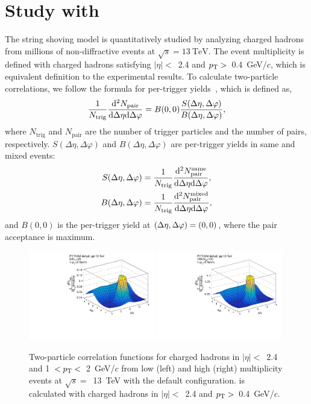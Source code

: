 
\section{Study with \pythia}
\label{sec:ana}
The string shoving model is quantitatively studied by analyzing charged hadrons from millions of non-diffractive \pythia \pp events at $\sqrt{s}=13~\mathrm{TeV}$. 
The event multiplicity is defined with charged hadrons satisfying $|\eta|<$~2.4 and $\mbox{$p_{\mathrm{T}}$}>$~0.4~GeV/$c$, which is equivalent definition to the experimental results.
To calculate two-particle correlations, we follow the formula for per-trigger yields~\cite{Khachatryan:2015lva}, which is defined as, 
\begin{align}
    \frac{1}{N_{\rm{trig}}} \frac{ {\rm d^{2}} N_{\rm{pair}} }{ \rm{d}\mbox{$\Delta\eta$} \rm{d}\mbox{$\Delta\varphi$}} = B(0,0)\frac{S(\mbox{$\Delta\eta$}, \mbox{$\Delta\varphi$})}{B(\mbox{$\Delta\eta$}, \mbox{$\Delta\varphi$})},
\end{align}
where $N_\mathrm{trig}$ and $N_\mathrm{pair}$ are the number of trigger particles and the number of pairs, respectively.
$S (\Delta\eta, \Delta\varphi)$ and $B(\Delta\eta, \Delta\varphi)$ are per-trigger yields in same and mixed events:
\begin{align}
    S(\mbox{$\Delta\eta$},\mbox{$\Delta\varphi$}) &= \frac{1}{N_{{\rm trig}}} \frac{ {\rm d^{2}} N_{\rm{pair}}^{\rm same} }{ \rm{d}\mbox{$\Delta\eta$} \rm{d}\mbox{$\Delta\varphi$}},\\
    B(\mbox{$\Delta\eta$},\mbox{$\Delta\varphi$}) &= \frac{1}{N_{{\rm trig}}} \frac{ {\rm d^{2}} N_{\rm{pair}}^{\rm mixed} }{ \rm{d}\mbox{$\Delta\eta$} \rm{d}\mbox{$\Delta\varphi$}},
\end{align}
and $B(0, 0)$ is the per-trigger yield at $(\mbox{$\Delta\eta$},\mbox{$\Delta\varphi$})=(0,0)$, where the pair acceptance is maximum.

\begin{figure}[tbh]
\includegraphics[width=0.49\textwidth]{figures/2D_default_lo_final.pdf}
\includegraphics[width=0.49\textwidth]{figures/2D_default_hi_final.pdf}
\caption{Two-particle correlation functions for charged hadrons in $|\eta|<$~2.4 and 1~$<\mbox{$p_{\mathrm{T}}$}<$~2~GeV/$c$ from low (left) and high (right) multiplicity \pythia \pp events at $\sqrt{s}=$~13~TeV with the default configuration. \Nch is calculated with charged hadrons in $|\eta|<$~2.4 and $\mbox{$p_{\mathrm{T}}$}>$~0.4~GeV/$c$.}
\label{fig:2d_default_final}
\end{figure}

